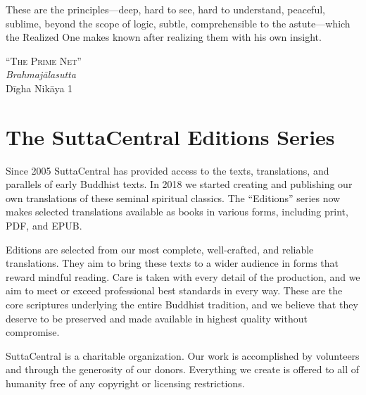 \documentclass[12pt,openany]{book}%
\newcommand{\blankpage}{
\newpage
\thispagestyle{empty}
\mbox{}
\newpage
}
\newcommand*{\epigraphTranslatedTitle}[1]{\vspace*{.5em}\footnotesize\textsc{#1}\\}%
\newcommand*{\epigraphRootTitle}[1]{\footnotesize\textit{#1}\\}%
\newcommand*{\epigraphReference}[1]{\footnotesize{#1}}%
\begin{document}
\newpage

\setlength{\parindent}{1.5em}%
\newpage

\vspace*{\fill}

\begin{center}
\epigraph{These are the principles—deep, hard to see, hard to understand, peaceful, sublime, beyond the scope of logic, subtle, comprehensible to the astute—which the Realized One makes known after realizing them with his own insight.}
{
\epigraphTranslatedTitle{“The Prime Net”}
\epigraphRootTitle{\textsanskrit{Brahmajālasutta}}
\epigraphReference{\textsanskrit{Dīgha} \textsanskrit{Nikāya} 1}
}
\end{center}

\vspace*{2in}

\vspace*{\fill}

\blankpage%

\setlength{\parindent}{1em}
%
\tableofcontents
\newpage
\pagestyle{fancy}
%
\chapter*{The SuttaCentral Editions Series}

Since 2005 SuttaCentral has provided access to the texts, translations, and parallels of early Buddhist texts. In 2018 we started creating and publishing our own translations of these seminal spiritual classics. The “Editions” series now makes selected translations available as books in various forms, including print, PDF, and EPUB.

Editions are selected from our most complete, well-crafted, and reliable translations. They aim to bring these texts to a wider audience in forms that reward mindful reading. Care is taken with every detail of the production, and we aim to meet or exceed professional best standards in every way. These are the core scriptures underlying the entire Buddhist tradition, and we believe that they deserve to be preserved and made available in highest quality without compromise.

SuttaCentral is a charitable organization. Our work is accomplished by volunteers and through the generosity of our donors. Everything we create is offered to all of humanity free of any copyright or licensing restrictions. 
\end{document}
